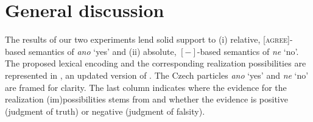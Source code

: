 \documentclass[output=paper,colorlinks,citecolor=brown]{langscibook}
\begin{document}



\section{General discussion}\label{hrdsim:sec:discussion}

The results of our two experiments lend solid support to (i) relative, \textsc{[agree]}-based semantics of \textit{ano} `yes' and (ii) absolute, $[-]$-based semantics of \textit{ne} `no'. The proposed lexical encoding and the corresponding realization possibilities are represented in , an updated version of . The Czech particles \textit{ano} `yes' and \textit{ne} `no' are framed for clarity. The last column indicates where the evidence for the realization (im)possibilities stems from and whether the evidence is positive (judgment of truth) or negative (judgment of falsity).
\end{document}
